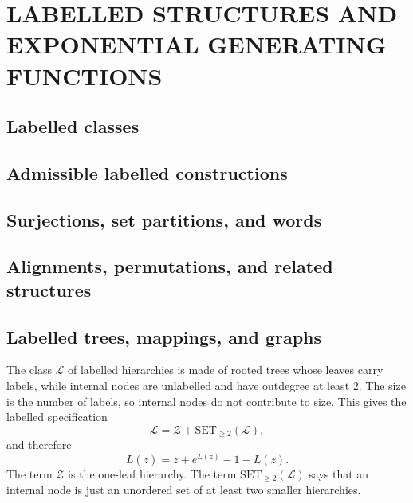 \chapter{LABELLED STRUCTURES AND EXPONENTIAL GENERATING FUNCTIONS}
\label{chap:labelled structures and exponential generating functions}

\section{Labelled classes}

\section{Admissible labelled constructions}

\section{Surjections, set partitions, and words}

\section{Alignments, permutations, and related structures}

\section{Labelled trees, mappings, and graphs}

The class $\mathcal{L}$ of labelled hierarchies is made of rooted trees whose leaves carry
labels, while internal nodes are unlabelled and have outdegree at least $2$. The size is the
number of labels, so internal nodes do not contribute to size. This gives the labelled
specification
\begin{equation*}
    \mathcal{L} = \mathcal{Z} + \mathrm{SET}_{\geq 2}(\mathcal{L}),
\end{equation*}
and therefore
\begin{equation*}
    L(z) = z + e^{L(z)} - 1 - L(z).
\end{equation*}
The term $\mathcal{Z}$ is the one-leaf hierarchy. The term
$\mathrm{SET}_{\geq 2}(\mathcal{L})$ says that an internal node is just an unordered set of
at least two smaller hierarchies.


